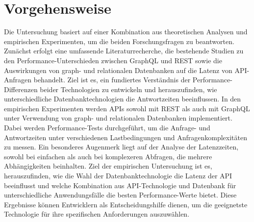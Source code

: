 \section{Vorgehensweise} %
\label{sec:vorgehensweise}
Die Untersuchung basiert auf einer Kombination aus theoretischen Analysen und empirischen Experimenten, um die beiden Forschungsfragen zu beantworten. Zunächst erfolgt eine umfassende Literaturrecherche, die bestehende Studien zu den Performance-Unterschieden zwischen GraphQL und REST sowie die Auswirkungen von graph- und relationalen Datenbanken auf die Latenz von API-Anfragen behandelt. Ziel ist es, ein fundiertes Verständnis der Performance-Differenzen beider Technologien zu entwickeln und herauszufinden, wie unterschiedliche Datenbanktechnologien die Antwortzeiten beeinflussen.
In den empirischen Experimenten werden APIs sowohl mit REST als auch mit GraphQL unter Verwendung von graph- und relationalen Datenbanken implementiert. Dabei werden Performance-Tests durchgeführt, um die Anfrage- und Antwortzeiten unter verschiedenen Lastbedingungen und Anfragenkomplexitäten zu messen. Ein besonderes Augenmerk liegt auf der Analyse der Latenzzeiten, sowohl bei einfachen als auch bei komplexeren Abfragen, die mehrere Abhängigkeiten beinhalten. Ziel der empirischen Untersuchung ist es, herauszufinden, wie die Wahl der Datenbanktechnologie die Latenz der API beeinflusst und welche Kombination aus API-Technologie und Datenbank für unterschiedliche Anwendungsfälle die besten Performance-Werte bietet. Diese Ergebnisse können Entwicklern als Entscheidungshilfe dienen, um die geeignetste Technologie für ihre spezifischen Anforderungen auszuwählen.
